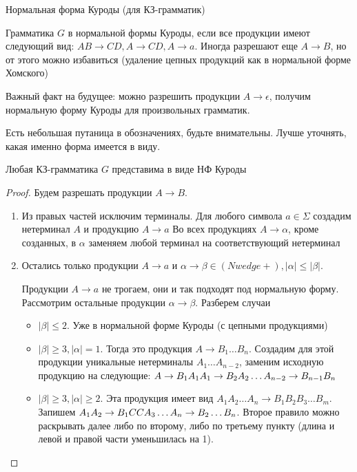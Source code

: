 \begin{Def}
Нормальная форма Куроды (для КЗ-грамматик)

Грамматика $G$ в нормальной формы Куроды, если все продукции имеют следующий вид: $AB \to CD, A \to CD, A \to a$. 
Иногда разрешают еще $A \to B$, но от этого можно избавиться (удаление цепных продукций как в нормальной форме Хомского)
\end{Def}
\begin{Rem}
Важный факт на будущее: можно разрешить продукции $A \to \epsilon$, получим нормальную форму Куроды для произвольных грамматик.
\end{Rem}
\begin{Rem}
Есть небольшая путаница в обозначениях, будьте внимательны. Лучше уточнять, какая именно форма имеется в виду.
\end{Rem}
\begin{theorem}
Любая КЗ-грамматика $G$ представима в виде НФ Куроды
\end{theorem}
\begin{proof}
Будем разрешать продукции $A \to B$.
\begin{enumerate}
\item
Из правых частей исключим терминалы.
Для любого символа $a \in \Sigma$ создадим нетерминал $A$ и продукцию $A \to a$
Во всех продукциях $A \to \alpha$, кроме созданных, в $\alpha$ заменяем любой терминал на соответствующий нетерминал

\item
Остались только продукции $A \to a$ и $\alpha \to \beta \in (Nwedge+), |\alpha| \leq |\beta|$. 

Продукции $A \to a$ не трогаем, они и так подходят под нормальную форму.
Рассмотрим остальные продукции $\alpha \to \beta$. Разберем случаи
\begin{itemize}
\item
$|\beta| \leq 2$. Уже в нормальной форме Куроды (с цепными продукциями)
\item
$|\beta| \geq 3, |\alpha| = 1$. Тогда это продукция $A \to B_1 \dots B_n$.
Создадим для этой продукции уникальные нетерминалы $A_1 \dots A_{n - 2}$, заменим исходную продукцию на следующие: $\\
A \to B_1 A_1 \\
A_1 \to B_2 A_2 \\ 
\dots \\
A_{n - 2} \to B_{n - 1} B_n
$
\item
$|\beta| \geq 3, |\alpha| \geq 2$. Эта продукция имеет вид $A_1A_2 \dots A_n \to B_1B_2B_3 \dots B_m$.
Запишем $\\
A_1 A_2 \to B_1 C \\
C A_3 \dots A_n \to B_2 \dots B_n$.
Второе правило можно раскрывать далее либо по второму, либо по третьему пункту (длина и левой и правой части уменьшилась на 1).
\end{itemize}
\end{enumerate}
\end{proof}

